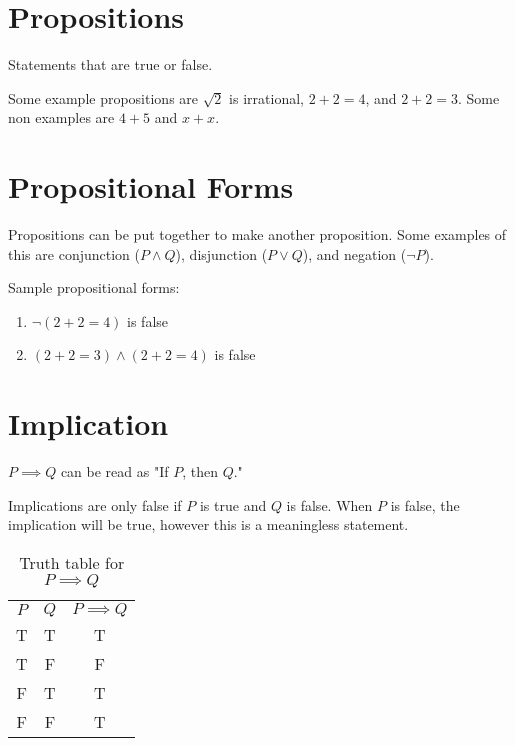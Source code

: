 
\section{Propositions}
\begin{definition}[Propositions]
  Statements that are true or false.
\end{definition}

Some example propositions are $\sqrt{2}$ is irrational, $2+2=4$, and $2+2=3$.
Some non examples are $4+5$ and $x+x$.
\section{Propositional Forms}
Propositions can be put together to make another proposition. Some examples of
this are conjunction ($P \land Q$), disjunction ($P \lor Q$), and negation ($\lnot P$).

\begin{example}
  Sample propositional forms:
\begin{enumerate}
  \item $\lnot (2+2=4)$ is false
  \item $(2+2=3)\land (2+2=4)$ is false
\end{enumerate}
\end{example}

\section{Implication}
\begin{definition}[Implication]
  $P \implies Q$ can be read as "If $P$, then $Q$."

  Implications are only false if $P$ is true and $Q$ is false. When $P$ is false,
  the implication will be true, however this is a meaningless statement.
  \begin{table}[htpb]
    \centering
    \caption{Truth table for $P \implies Q$}
    \label{tab:label}
    \begin{tabular}{|c|c|c|}
      $P$ & $Q$ & $P \implies Q$ \\
      T & T & T \\
      T & F & F \\
      F & T & T \\
      F & F & T
    \end{tabular}
  \end{table}
\end{definition}


